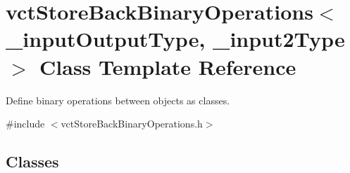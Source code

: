 \hypertarget{classvct_store_back_binary_operations}{}\section{vct\+Store\+Back\+Binary\+Operations$<$ \+\_\+input\+Output\+Type, \+\_\+input2\+Type $>$ Class Template Reference}
\label{classvct_store_back_binary_operations}


Define binary operations between objects as classes.  




{\ttfamily \#include $<$vct\+Store\+Back\+Binary\+Operations.\+h$>$}

\subsection*{Classes}
